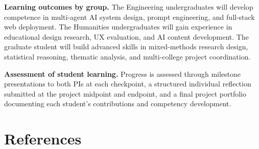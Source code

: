 \documentclass[11pt,a4paper]{article}
\begin{document}
\vspace{0.3cm}
\noindent\textbf{Learning outcomes by group.} The Engineering undergraduates will develop competence in multi-agent AI system design, prompt engineering, and full-stack web deployment. The Humanities undergraduates will gain experience in educational design research, UX evaluation, and AI content development. The graduate student will build advanced skills in mixed-methods research design, statistical reasoning, thematic analysis, and multi-college project coordination.

\noindent\textbf{Assessment of student learning.} Progress is assessed through milestone presentations to both PIs at each checkpoint, a structured individual reflection submitted at the project midpoint and endpoint, and a final project portfolio documenting each student's contributions and competency development.

\section{References}
\end{document}
